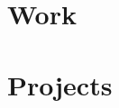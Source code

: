 \documentclass[12pt, a4paper, sans]{moderncv}
\begin{document}
\maketitle

\section{Work}

    

\section{Projects}

    
\end{document}
